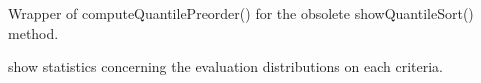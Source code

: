 \documentclass[letterpaper,10pt,english]{sphinxmanual}
\begin{document}
\begin{fulllineitems}
\begin{fulllineitems}
\end{fulllineitems}


\begin{fulllineitems}
\label{techDoc:perfTabs.PerformanceTableau.showQuantileSort}
Wrapper of computeQuantilePreorder() for the obsolete showQuantileSort() method.

\end{fulllineitems}


\begin{fulllineitems}
\label{techDoc:perfTabs.PerformanceTableau.showStatistics}
show statistics concerning the evaluation distributions
on each criteria.

\end{fulllineitems}


\end{fulllineitems}

\end{document}
